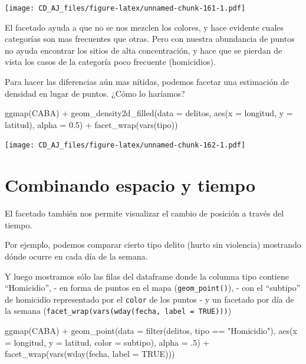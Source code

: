 \documentclass[
]{book}
\newenvironment{Shaded}{\begin{snugshade}}{\end{snugshade}}
\newcommand{\AttributeTok}[1]{\textcolor[rgb]{0.77,0.63,0.00}{#1}}
\newcommand{\ConstantTok}[1]{\textcolor[rgb]{0.00,0.00,0.00}{#1}}
\newcommand{\DecValTok}[1]{\textcolor[rgb]{0.00,0.00,0.81}{#1}}
\newcommand{\FloatTok}[1]{\textcolor[rgb]{0.00,0.00,0.81}{#1}}
\newcommand{\FunctionTok}[1]{\textcolor[rgb]{0.00,0.00,0.00}{#1}}
\newcommand{\NormalTok}[1]{#1}
\newcommand{\SpecialCharTok}[1]{\textcolor[rgb]{0.00,0.00,0.00}{#1}}
\newcommand{\StringTok}[1]{\textcolor[rgb]{0.31,0.60,0.02}{#1}}
\begin{document}
\texttt{[image: CD\_AJ\_files/figure-latex/unnamed-chunk-161-1.pdf]}

El facetado ayuda a que no se nos mezclen los colores, y hace evidente cuales categorías son mas frecuentes que otras. Pero con nuestra abundancia de puntos no ayuda encontrar los sitios de alta concentración, y hace que se pierdan de vista los casos de la categoría poco frecuente (homicidios).

Para hacer las diferencias aún mas nítidas, podemos facetar una estimación de densidad en lugar de puntos. ¿Cómo lo haríamos?

\begin{Shaded}
\begin{Highlighting}[]
\FunctionTok{ggmap}\NormalTok{(CABA) }\SpecialCharTok{+}
    \FunctionTok{geom\_density2d\_filled}\NormalTok{(}\AttributeTok{data =}\NormalTok{ delitos, }\FunctionTok{aes}\NormalTok{(}\AttributeTok{x =}\NormalTok{ longitud, }\AttributeTok{y =}\NormalTok{ latitud), }\AttributeTok{alpha =} \FloatTok{0.5}\NormalTok{) }\SpecialCharTok{+}
    \FunctionTok{facet\_wrap}\NormalTok{(}\FunctionTok{vars}\NormalTok{(tipo))}
\end{Highlighting}
\end{Shaded}

\texttt{[image: CD\_AJ\_files/figure-latex/unnamed-chunk-162-1.pdf]}

\hypertarget{combinando-espacio-y-tiempo}{%
\section{Combinando espacio y tiempo}\label{combinando-espacio-y-tiempo}}

El facetado también nos permite visualizar el cambio de posición a través del tiempo.

Por ejemplo, podemos comparar cierto tipo delito (hurto sin violencia) mostrando dónde ocurre en cada día de la semana.

Y luego mostramos sólo las filas del dataframe donde la columna tipo contiene ``Homicidio'',
- en forma de puntos en el mapa (\texttt{geom\_point()}),
- con el ``subtipo'' de homicidio representado por el \texttt{color} de los puntos
- y un facetado por día de la semana (\texttt{facet\_wrap(vars(wday(fecha,\ label\ =\ TRUE)))})

\begin{Shaded}
\begin{Highlighting}[]
\FunctionTok{ggmap}\NormalTok{(CABA) }\SpecialCharTok{+}
    \FunctionTok{geom\_point}\NormalTok{(}\AttributeTok{data =} \FunctionTok{filter}\NormalTok{(delitos, tipo }\SpecialCharTok{==} \StringTok{"Homicidio"}\NormalTok{),}
               \FunctionTok{aes}\NormalTok{(}\AttributeTok{x =}\NormalTok{ longitud, }\AttributeTok{y =}\NormalTok{ latitud, }\AttributeTok{color =}\NormalTok{ subtipo), }\AttributeTok{alpha =}\NormalTok{ .}\DecValTok{5}\NormalTok{) }\SpecialCharTok{+}
    \FunctionTok{facet\_wrap}\NormalTok{(}\FunctionTok{vars}\NormalTok{(}\FunctionTok{wday}\NormalTok{(fecha, }\AttributeTok{label =} \ConstantTok{TRUE}\NormalTok{)))}
\end{Highlighting}
\end{Shaded}
\end{document}
